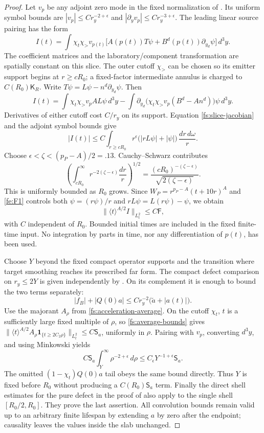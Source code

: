 \begin{proof}
Let $v_p$ be any adjoint zero mode in the fixed normalization of
.  Its uniform symbol bounds are
$|v_p|\le C r_y^{-2+\epsilon}$ and
$|\partial_yv_p|\le C r_y^{-3+\epsilon}$.
The leading linear source pairing has the form
\[
 I(t)=\int \chi_t\chi_>v_{p(t)}
 \bigl[A(p(t))T\psi+B^d(p(t))\partial_{y_d}\psi\bigr]\,d^3y .
\]
The coefficient matrices and the laboratory/component transformation
are spatially constant on this slice.  The outer cutoff $\chi_>$ can
be chosen so its emitter support begins at $r\ge cR_0$; a fixed-factor
intermediate annulus is charged to $C(R_0)\mathsf K_R$.
Write $T\psi=L\psi-n^d\partial_{y_d}\psi$.  Then
\[
 I(t)=\int\chi_t\chi_>v_p A L\psi\,d^3y
 -\int\partial_{y_d}\bigl(\chi_t\chi_>v_p(B^d-An^d)\bigr)
                    \psi\,d^3y .
\]
Derivatives of either cutoff cost $C/r_y$ on its support.
Equation \eqref{fs:slice-jacobian} and the adjoint symbol bounds give
\[
 |I(t)|\le C\int_{r\ge cR_0}
 r^\epsilon\bigl(|rL\psi|+|\psi|\bigr)\,\frac{dr\,d\omega}{r}.
\]
Choose $\epsilon<\zeta<(p_P-A)/2=.13$.  Cauchy--Schwarz contributes
\[
 \left(\int_{cR_0}^\infty r^{-2(\zeta-\epsilon)}\frac{dr}{r}\right)^{1/2}
 =\frac{(cR_0)^{-(\zeta-\epsilon)}}{\sqrt{2(\zeta-\epsilon)}}.
\]
This is uniformly bounded as $R_0$ grows.  Since
$W_P=r^{p_P-A}(t+10r)^A$ and \eqref{fe:F1} controls both
$\psi=(r\psi)/r$ and $rL\psi=L(r\psi)-\psi$, we obtain
\[
 \|\langle t\rangle^{A/2}I\|_{L^2_t}\le C\mathsf F ,
\]
with $C$ independent of $R_0$.  Bounded initial times are included
in the fixed finite-time input.  No integration by parts in time,
nor any differentiation of $p(t)$, has been used.

Choose $Y$ beyond the fixed compact operator supports and the
transition where target smoothing reaches its prescribed far form.  The
compact defect comparison on $r_y\le2Y$ is given independently by
.  On its complement it is enough to bound the two terms
separately:
\[
 |f_B|+|Q(0)a|\le C r_y^{-2}
             \bigl(\widetilde a+|a(t)|\bigr).
\]
Use the majorant $A_\rho$ from \eqref{fs:acceleration-average}.
On the cutoff $\chi_t$, $t$ is a sufficiently large fixed multiple
of $\rho$, so \eqref{fs:average-bounds} gives
$\|\langle t\rangle^{A/2}A_\rho\mathbf1_{\{t\ge2C_2\rho\}}
\|_{L^2_t}\le C\mathsf S_a$, uniformly in $\rho$.
Pairing with $v_p$, converting $d^3y$, and
using Minkowski yields
\[
 C\mathsf S_a\int_Y^\infty \rho^{-2+\epsilon}\,d\rho
 \le C_\epsilon Y^{-1+\epsilon}\mathsf S_a .
\]
The omitted $(1-\chi_t)Q(0)a$ tail obeys the same bound directly.
Thus $Y$ is fixed before $R_0$ without producing a
$C(R_0)\mathsf S_a$ term.  Finally the direct shell estimates for
the pure defect in the proof of  also apply
to the single shell $[R_0/2,R_0]$.  They prove the last assertion.
All convolution bounds remain valid up to an arbitrary finite
lifespan by extending $a$ by zero after the endpoint; causality
leaves the values inside the slab unchanged.
\end{proof}

